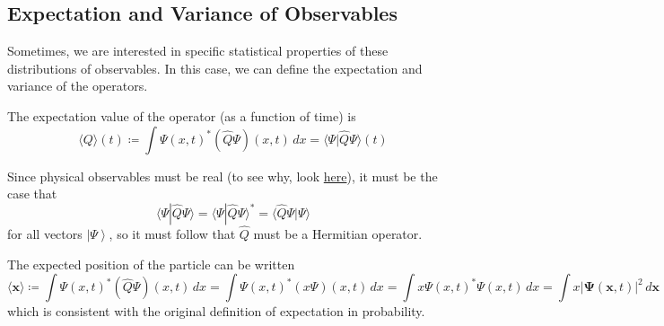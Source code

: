 \documentclass{article}
\newcommand{\ket}[1]{\ensuremath{\left|#1\right\rangle}}
\newcommand{\braket}[2]{\langle #1 | #2 \rangle}
\begin{document}
  \subsection{Expectation and Variance of Observables}

    Sometimes, we are interested in specific statistical properties of these distributions of observables. In this case, we can define the expectation and variance of the operators. 

    \begin{definition}
      The expectation value of the operator (as a function of time) is
      \begin{equation} 
        \langle Q \rangle (t) \coloneqq \int \Psi (x, t)^\ast (\hat{Q} \Psi) (x, t) \,dx = \braket{\Psi}{\hat{Q} \Psi}(t)
      \end{equation}
    \end{definition}

    Since physical observables must be real (to see why, look \href{https://physics.stackexchange.com/questions/436462/why-is-there-a-physical-preference-to-real-numbers}{here}), it must be the case that 
    \begin{equation} 
      \braket{\Psi}{\hat{Q} \Psi} = \braket{\Psi}{\hat{Q} \Psi}^\ast = \braket{\hat{Q} \Psi}{\Psi}
    \end{equation}
    for all vectors $\ket{\Psi}$, so it must follow that $\hat{Q}$ must be a Hermitian operator. 

    \begin{example}
      The expected position of the particle can be written
      \begin{equation} 
        \langle \mathbf{x} \rangle \coloneqq \int \Psi (x, t)^\ast (\hat{Q} \Psi)(x, t) \,dx = \int \Psi(x, t)^\ast (x \Psi)(x, t) \,dx = \int x \Psi (x, t)^\ast \Psi(x, t) \,dx = \int x |\boldsymbol{\Psi}(\mathbf{x}, t)|^2 \,d \mathbf{x}
      \end{equation} 
      which is consistent with the original definition of expectation in probability. 
    \end{example}
\end{document}
